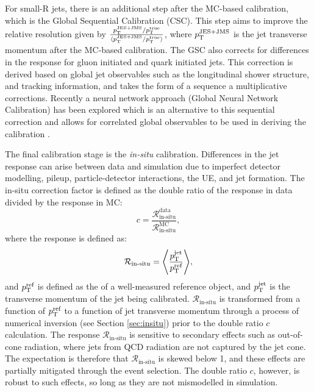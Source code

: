 For small-R jets, there is an additional step after the MC-based calibration, which is the Global Sequential Calibration (CSC). This step aims to improve the relative \pt resolution given by $\frac{p_{\text{T}}^{\text{JES+JMS}}/p_{\text{T}}^{\text{true}}}{\langle p_{\text{T}}^{\text{JES+JMS}}/p_{\text{T}}^{\text{true}}\rangle}$, where $p_{\text{T}}^{\text{JES+JMS}}$ is the jet transverse momentum after the MC-based calibration. The GSC also corrects for differences in the \pt response for gluon initiated and quark initiated jets. This correction is derived based on global jet observables such as the longitudinal shower structure, and tracking information, and takes the form of a sequence a multiplicative corrections. Recently a neural network approach (Global Neural Network Calibration) has been explored which is an alternative to this sequential correction and allows for correlated global observables to be used in deriving the calibration \cite{Atlas:smallrnewtechniques}.

The final calibration stage is the \textit{in-situ} calibration. Differences in the jet response can arise between data and simulation due to imperfect detector modelling, pileup, particle-detector interactions, the UE, and jet formation. The in-situ correction factor is defined as the double ratio of the response in data divided by the response in MC:
\begin{equation}
    c=\frac{\mathcal{R}^{\text{data}}_{\text{in-situ}}}{\mathcal{R}^{\text{MC}}_{\text{in-situ}}},
\end{equation}
where the response is defined as:
\begin{equation}
    \mathcal{R}_{\text{in-situ}} = \Bigg\langle\frac{p_{\text{T}}^{\text{jet}}}{p_{\text{T}}^{\text{ref}}}\Bigg\rangle,
\end{equation}
and $p_{\text{T}}^{\text{ref}}$ is defined as the \pt of a well-measured reference object, and $p_{\text{T}}^{\text{jet}}$ is the transverse momentum of the jet being calibrated. $\mathcal{R}_{\text{in-situ}}$ is transformed from a function of $p_{\text{T}}^{\text{ref}}$ to a function of jet transverse momentum through a process of numerical inversion (see Section \ref{sec:insitu}) prior to the double ratio $c$ calculation. The response $\mathcal{R}_{\text{in-situ}}$ is sensitive to secondary effects such as out-of-cone radiation, where jets from QCD radiation are not captured by the jet cone. The expectation is therefore that $\mathcal{R}_{\text{in-situ}}$ is skewed below 1, and these effects are partially mitigated through the event selection. The double ratio $c$, however, is robust to such effects, so long as they are not mismodelled in simulation. 

